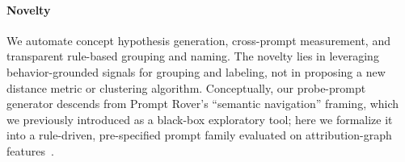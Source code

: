 \paragraph{Novelty}
We automate concept hypothesis generation, cross-prompt measurement, and transparent rule-based grouping and naming. The novelty lies in leveraging behavior-grounded signals for grouping and labeling, not in proposing a new distance metric or clustering algorithm. Conceptually, our probe-prompt generator descends from Prompt Rover's ``semantic navigation'' framing, which we previously introduced as a black-box exploratory tool; here we formalize it into a rule-driven, pre-specified prompt family evaluated on attribution-graph features~\cite{birardi2025insight,birardi2025promptrover}.


